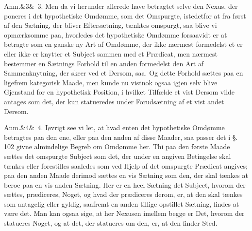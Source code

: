 \documentclass[12pt]{book}
\def\sperr#1{#1}%
\def\textit#1{#1}%
\def\emph#1{#1}%
\newcommand{\sperr}[1]{\textls[180]{#1}}
\newcommand{\anm}[1]{%
  \par\vspace{0.5\baselineskip}%
  \noindent\hspace{\parindent}\sperr{Anm.}\ifx&#1&\else~\textit{#1}.\fi
  \enspace\ignorespaces
}
\newcommand{\opage}[1]{\marginnote{\footnotesize\textit{[#1]}}}
\begin{document}
\anm{3} Men da vi herunder allerede have betragtet selve den \emph{Nexus}, der
poneres i det hypothetiske Omdømme, som det \emph{Omspurgte}, istedetfor at fra
først af den Sætning, der bliver Eftersætning, tænktes omspurgt, saa blive vi
opmærksomme paa, hvorledes det hypothetiske Omdømme forsaavidt er at betragte
som en ganske ny Art af Omdømme, der ikke nærmest formedelst et er eller ikke er
knytter et Subject sammen med et Prædicat, men nærmest bestemmer en Sætnings
Forhold til en anden formedelst den Art af Sammenknytning, der skeer ved et
\emph{Dersom, saa}. Og dette Forhold sættes paa en
\opage{290} ligefrem kategorisk Maade, men kunde nu vistnok ogsaa igjen selv blive Gjenstand
for en hypothetisk Position, i hvilket Tilfælde et vist \emph{Dersom} vilde
antages som det, der kun statueredes under Forudsætning af et vist andet
\emph{Dersom}.

\anm{4} Iøvrigt see vi let, at hvad enten det hypothetiske Omdømme betragtes paa
den ene, eller paa den anden af disse Maader, saa passer det i §. 102 givne
almindelige Begreb om Omdømme her. Thi paa den første Maade sættes det omspurgte
Subject som det, der under en angiven Betingelse skal tænkes eller forestilles
saaledes som ved Hjelp af det omspurgte Prædicat angives; paa den anden Maade
derimod sættes en vis Sætning som den, der skal tænkes at beroe paa en vis anden
Sætning. Her er en heel Sætning det Subject, hvorom der sættes, prædiceres,
Noget, og hvad der prædiceres derom, er, at den skal tænkes som antagelig eller
gyldig, saafremt en anden tillige opstillet Sætning, findes at være det. Man kan
ogsaa sige, at her \emph{Nexusen} imellem begge er Det, hvorom der statueres
Noget, og at det, der statueres om den, er, at den finder Sted.
\end{document}
